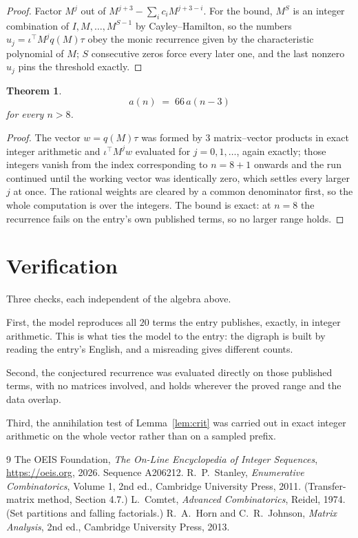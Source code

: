\documentclass[11pt,a4paper]{article}
\theoremstyle{plain}
\newtheorem{theorem}{Theorem}
\theoremstyle{definition}
\begin{document}
\begin{proof}
Factor $M^{j}$ out of $M^{j+3}-\sum_ic_iM^{j+3-i}$. For the bound, $M^{S}$
is an integer combination of $I,M,\dots,M^{S-1}$ by Cayley--Hamilton, so the numbers
$u_j=\iota^{\!\top}M^{j}q(M)\tau$ obey the monic recurrence given by the characteristic
polynomial of $M$; $S$ consecutive zeros force every later one, and the last nonzero $u_j$
pins the threshold exactly.
\end{proof}

\begin{theorem}
\[
a(n)\;=\;66\,a(n-3)
\]
for every $n>8$.
\end{theorem}

\begin{proof}
The vector $w=q(M)\tau$ was formed by $3$ matrix--vector products in exact integer
arithmetic and $\iota^{\!\top}M^{j}w$ evaluated for $j=0,1,\dots$, again exactly; those
integers vanish from the index corresponding to $n=8+1$ onwards and the run continued
until the working vector was identically zero, which settles every larger $j$ at once. The
rational weights are cleared by a common denominator first, so the whole computation is over
the integers. The bound is exact: at $n=8$ the recurrence fails on the entry's own published terms, so no larger range holds.
\end{proof}

\section{Verification}

Three checks, each independent of the algebra above.

First, the model reproduces all $20$ terms the entry publishes, exactly, in integer
arithmetic. This is what ties the model to the entry: the digraph is built by reading the
entry's English, and a misreading gives different counts.

Second, the conjectured recurrence was evaluated directly on those published terms, with no
matrices involved, and holds wherever the proved range and the data overlap.

Third, the annihilation test of Lemma~\ref{lem:crit} was carried out in exact integer
arithmetic on the whole vector rather than on a sampled prefix.

\begin{thebibliography}{9}
 The OEIS Foundation, \emph{The On-Line Encyclopedia of Integer
Sequences}, \url{https://oeis.org}, 2026. Sequence A206212.
 R.~P.~Stanley, \emph{Enumerative Combinatorics}, Volume 1, 2nd ed.,
Cambridge University Press, 2011. (Transfer-matrix method, Section 4.7.)
 L.~Comtet, \emph{Advanced Combinatorics}, Reidel, 1974. (Set partitions
and falling factorials.)
 R.~A.~Horn and C.~R.~Johnson, \emph{Matrix Analysis}, 2nd ed., Cambridge
University Press, 2013.
\end{thebibliography}
\end{document}
